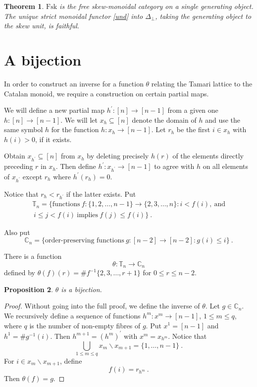 \documentclass[a4paper,12pt,reqno]{amsart}
\newtheorem{theorem}{Theorem}[section] %
\newtheorem{proposition}[theorem]{Proposition}
\theoremstyle{definition}
\theoremstyle{fact}
\theoremstyle{genquest}
\theoremstyle{step}
\newcommand{\lra}{\longrightarrow}
\begin{document}
\begin{theorem}
$\mathrm{Fsk}$ is the free skew-monoidal category on a single generating object.
The unique strict monoidal functor \eqref{und} into $\Delta_{\bot}$, taking the generating object to the skew unit, is faithful. 
\end{theorem}

\section{A bijection}

In order to construct an inverse for a function $\theta$ relating the Tamari lattice to the Catalan monoid, 
we require a construction on certain partial maps.

We will define a new partial map $h^{\prime} : [n] \lra [n-1]$ from a given one $h : [n] \lra [n-1]$.
We will let $x_h \subseteq [n]$ denote the domain of $h$ and use the same symbol $h$ for the function $h: x_h \lra [n-1]$. 
Let $r_h$ be the first $i \in x_h$ with $h(i) > 0$, if it exists.

Obtain $x_{h^{\prime}} \subseteq [n]$ from $x_h$ by deleting precisely $h(r)$ 
of the elements directly preceding $r$ in $x_h$. 
Then define $h^{\prime} : x_{h^{\prime}} \lra [n-1]$ to agree with $h$ on all elements of $x_{h^{\prime}}$
except $r_h$ where $h^{\prime}(r_h) = 0$.

Notice that $r_h < r_{h^{\prime}}$ if the latter exists.   
Put 
\begin{eqnarray*}
\mathbb{T}_n = \{ \text{functions} \  f : \{1,2,\dots , n-1\} \rightarrow \{2,3,\dots , n \} : i < f(i), \ \text{and} \\
  \ i \le j < f(i) \ \text{implies} \ f(j) \le f(i)\} \ .
\end{eqnarray*}

Also put 
$$\mathbb{C}_n = \{ \text{order-preserving functions} \ g : [n-2] \rightarrow [n-2] : g(i) \le i \} \ .$$

There is a function $$\theta : \mathbb{T}_n \lra \mathbb{C}_n $$
defined by $\theta (f) (r) = \#f^{-1} \{2, 3, \dots , r+1\}$ for $0 \le r \le n-2$.

\begin{proposition} $\theta$ is a bijection.
\end{proposition}
\begin{proof}
Without going into the full proof, we define the inverse of $\theta$.
Let $g\in \mathbb{C}_n$.
We recursively define a sequence of functions $h^m : x^m \lra [n-1]$, $1 \le m \le q$, where $q$ is the number of non-empty fibres of $g$. 
Put $x^1 = [n-1]$ and $h^1 = \# g^{-1}(i)$. 
Then $h^{m+1} = (h^m)^{\prime}$ with $x^{m} = x_{h^m}$.
Notice that $$\bigcup_{1\le m \le q} x_m \smallsetminus x_{m+1} = \{1, \dots , n-1\} \ . $$
For $i \in x_m \smallsetminus x_{m+1}$, define $$f(i) = r_{h^m} \ .$$ 
Then $\theta(f) = g$.
\end{proof}
\end{document}
